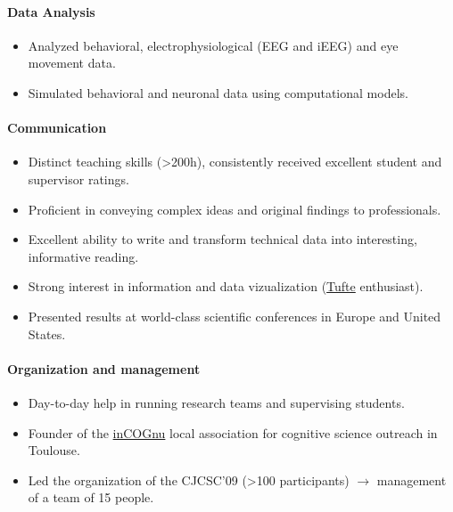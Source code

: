 \documentclass[margin,line]{resume}
\begin{document}
\begin{resume}
	\paragraph{Data Analysis}
	\begin{itemize} \itemsep1pt \parskip0pt  \leftmargin=0em \itemindent=-1.5em
  	\item Analyzed behavioral, electrophysiological (EEG and iEEG) and eye movement data.
	\item Simulated behavioral and neuronal data using computational models.
	\end{itemize}
		
	\paragraph{Communication}
	\begin{itemize} \itemsep1pt \parskip0pt  \leftmargin=0em \itemindent=-1.5em
  		\item Distinct teaching skills (>200h), consistently received excellent student and supervisor ratings.
  		\item Proficient in conveying complex ideas and original findings to professionals.
  		\item Excellent ability to write and transform technical data into interesting, informative reading.
  		\item Strong interest in information and data vizualization (\href{http://www.edwardtufte.com/tufte/}{Tufte} enthusiast).
  		\item Presented results at world-class scientific conferences in Europe and United States.
	\end{itemize}
	
	\paragraph{Organization and management}
	\begin{itemize} \itemsep1pt \parskip0pt  \leftmargin=0em \itemindent=-1.5em
		\item Day-to-day help in running research teams and supervising students.
  		\item Founder of the \href{http://incognu.fr/}{inCOGnu} local association for cognitive science outreach in Toulouse.
  		\item Led the organization of the CJCSC'09 (>100 participants) $\rightarrow$ management of a team of 15 people.
	\end{itemize}


\end{resume}
\end{document}
